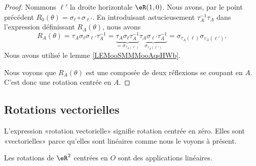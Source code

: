 \begin{proof}
    Nommons \( \ell'\) la droite horizontale \( \eR(1,0)\). Nous avons, par le point précédent \( R_0(\theta)=\sigma_{\ell}\circ \sigma_{\ell'}\). En introduisant astucieusement \( \tau_A^{-1}\tau_A\) dans l'expression définissant \( R_A(\theta)\), nous avons
    \begin{equation}
        R_A(\theta)=\tau_A\sigma_{\ell}\sigma_{\ell'}\tau_A^{-1}=\underbrace{\tau_A\sigma_{\ell}\tau_A^{-1}}_{=\sigma_{\tau_A(\ell)}}\underbrace{\tau_A\sigma_{\ell'}\tau_A^{-1}}_{\sigma_{\tau_A(\ell')}}=\sigma_{\tau_A(\ell)}\sigma_{\tau_A(\ell')}.
    \end{equation}
    Nous avons utilisé le lemme \ref{LEMooSMMMooAqsHWb}.

    Nous voyons que \( R_A(\theta)\) est une composée de deux réflexions se coupant en \( A\). C'est donc une rotation centrée en \( A\).
\end{proof}

\subsection{Rotations vectorielles}

L'expression «rotation vectorielle» signifie rotation centrée en zéro. Elles sont «vectorielles» parce qu'elles sont linéaires comme nous le voyons à présent.

\begin{proposition}     \label{PROPooTFNSooFjiWHG}
    Les rotations de \( \eR^2\) centrées en \( O\) sont des applications linéaires.
\end{proposition}

